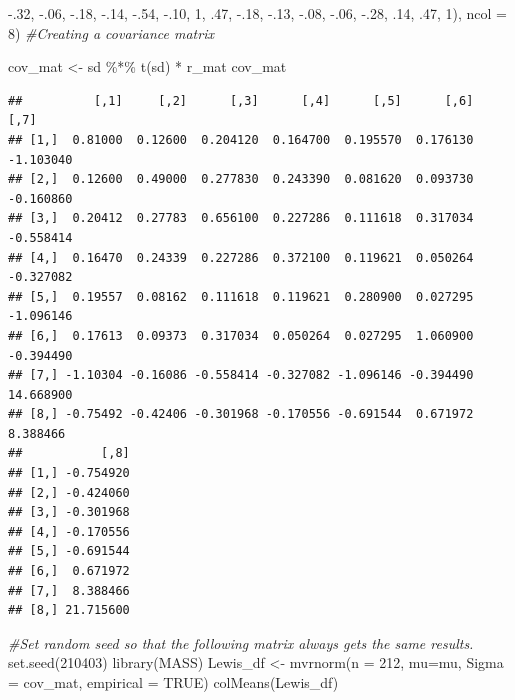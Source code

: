 \documentclass[
  11pt,
]{book}
\newenvironment{Shaded}{\begin{snugshade}}{\end{snugshade}}
\newcommand{\AttributeTok}[1]{\textcolor[rgb]{0.77,0.63,0.00}{#1}}
\newcommand{\CommentTok}[1]{\textcolor[rgb]{0.56,0.35,0.01}{\textit{#1}}}
\newcommand{\ConstantTok}[1]{\textcolor[rgb]{0.00,0.00,0.00}{#1}}
\newcommand{\DecValTok}[1]{\textcolor[rgb]{0.00,0.00,0.81}{#1}}
\newcommand{\FunctionTok}[1]{\textcolor[rgb]{0.00,0.00,0.00}{#1}}
\newcommand{\NormalTok}[1]{#1}
\newcommand{\OtherTok}[1]{\textcolor[rgb]{0.56,0.35,0.01}{#1}}
\newcommand{\SpecialCharTok}[1]{\textcolor[rgb]{0.00,0.00,0.00}{#1}}
\begin{document}
\begin{Shaded}
\begin{Highlighting}[]
        \SpecialCharTok{{-}}\NormalTok{.}\DecValTok{32}\NormalTok{, }\SpecialCharTok{{-}}\NormalTok{.}\DecValTok{06}\NormalTok{, }\SpecialCharTok{{-}}\NormalTok{.}\DecValTok{18}\NormalTok{, }\SpecialCharTok{{-}}\NormalTok{.}\DecValTok{14}\NormalTok{, }\SpecialCharTok{{-}}\NormalTok{.}\DecValTok{54}\NormalTok{, }\SpecialCharTok{{-}}\NormalTok{.}\DecValTok{10}\NormalTok{, }\DecValTok{1}\NormalTok{, .}\DecValTok{47}\NormalTok{,}
        \SpecialCharTok{{-}}\NormalTok{.}\DecValTok{18}\NormalTok{, }\SpecialCharTok{{-}}\NormalTok{.}\DecValTok{13}\NormalTok{, }\SpecialCharTok{{-}}\NormalTok{.}\DecValTok{08}\NormalTok{, }\SpecialCharTok{{-}}\NormalTok{.}\DecValTok{06}\NormalTok{, }\SpecialCharTok{{-}}\NormalTok{.}\DecValTok{28}\NormalTok{, .}\DecValTok{14}\NormalTok{, .}\DecValTok{47}\NormalTok{, }\DecValTok{1}\NormalTok{), }\AttributeTok{ncol =} \DecValTok{8}\NormalTok{)}
\CommentTok{\#Creating a covariance matrix}

\NormalTok{cov\_mat }\OtherTok{\textless{}{-}}\NormalTok{ sd }\SpecialCharTok{\%*\%} \FunctionTok{t}\NormalTok{(sd) }\SpecialCharTok{*}\NormalTok{ r\_mat}
\NormalTok{cov\_mat}
\end{Highlighting}
\end{Shaded}

\begin{verbatim}
##          [,1]     [,2]      [,3]      [,4]      [,5]      [,6]      [,7]
## [1,]  0.81000  0.12600  0.204120  0.164700  0.195570  0.176130 -1.103040
## [2,]  0.12600  0.49000  0.277830  0.243390  0.081620  0.093730 -0.160860
## [3,]  0.20412  0.27783  0.656100  0.227286  0.111618  0.317034 -0.558414
## [4,]  0.16470  0.24339  0.227286  0.372100  0.119621  0.050264 -0.327082
## [5,]  0.19557  0.08162  0.111618  0.119621  0.280900  0.027295 -1.096146
## [6,]  0.17613  0.09373  0.317034  0.050264  0.027295  1.060900 -0.394490
## [7,] -1.10304 -0.16086 -0.558414 -0.327082 -1.096146 -0.394490 14.668900
## [8,] -0.75492 -0.42406 -0.301968 -0.170556 -0.691544  0.671972  8.388466
##           [,8]
## [1,] -0.754920
## [2,] -0.424060
## [3,] -0.301968
## [4,] -0.170556
## [5,] -0.691544
## [6,]  0.671972
## [7,]  8.388466
## [8,] 21.715600
\end{verbatim}

\begin{Shaded}
\begin{Highlighting}[]
\CommentTok{\#Set random seed so that the following matrix always gets the same results.}
\FunctionTok{set.seed}\NormalTok{(}\DecValTok{210403}\NormalTok{)}
\FunctionTok{library}\NormalTok{(MASS)}
\NormalTok{Lewis\_df }\OtherTok{\textless{}{-}} \FunctionTok{mvrnorm}\NormalTok{(}\AttributeTok{n =} \DecValTok{212}\NormalTok{, }\AttributeTok{mu=}\NormalTok{mu, }\AttributeTok{Sigma =}\NormalTok{ cov\_mat, }\AttributeTok{empirical =} \ConstantTok{TRUE}\NormalTok{)}
\FunctionTok{colMeans}\NormalTok{(Lewis\_df)}
\end{Highlighting}
\end{Shaded}
\end{document}
